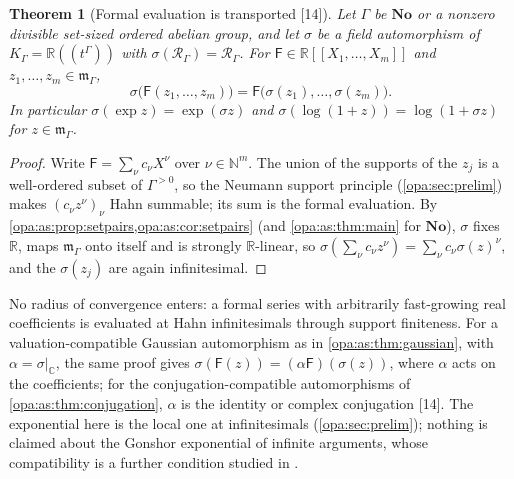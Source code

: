 \documentclass[11pt,oneside]{article}
\numberwithin{equation}{section}
\newtheorem{theorem}{Theorem}[section]
\theoremstyle{definition}
\theoremstyle{remark}
\newcommand{\No}{\mathbf{No}}
\newcommand{\R}{\mathbb R}
\newcommand{\C}{\mathbb C}
\newcommand{\N}{\mathbb N}
\newcommand{\mm}{\mathfrak m}
\newcommand{\Hahn}[2]{#1((t^{#2}))}
\newcommand{\src}[1]{\textup{\textsf{\small[#1]}}}
\begin{document}
\begin{theorem}[Formal evaluation is transported \src{14}]\label{opa:cm:thm:formal}
Let $\Gamma$ be $\No$ or a nonzero divisible set-sized ordered abelian group, and let $\sigma$
be a field automorphism of $K_\Gamma=\Hahn\R\Gamma$ with $\sigma(\mathcal R_\Gamma)=\mathcal R_\Gamma$.
For $\mathsf F\in\R[[X_1,\dots,X_m]]$ and $z_1,\dots,z_m\in\mm_\Gamma$,
\begin{equation}\label{opa:cm:eq:formal}
 \sigma\bigl(\mathsf F(z_1,\dots,z_m)\bigr)=\mathsf F\bigl(\sigma(z_1),\dots,\sigma(z_m)\bigr).
\end{equation}
In particular $\sigma(\exp z)=\exp(\sigma z)$ and $\sigma(\log(1+z))=\log(1+\sigma z)$ for
$z\in\mm_\Gamma$.
\end{theorem}
\begin{proof}
Write $\mathsf F=\sum_\nu c_\nu X^\nu$ over $\nu\in\N^m$. The union of the supports of the $z_j$ is
a well-ordered subset of $\Gamma^{>0}$, so the Neumann support principle
(\cref{opa:sec:prelim}) makes $(c_\nu z^\nu)_\nu$ Hahn summable; its sum is the formal evaluation.
By \cref{opa:as:prop:setpairs,opa:as:cor:setpairs} (and \cref{opa:as:thm:main} for $\No$),
$\sigma$ fixes $\R$, maps $\mm_\Gamma$ onto itself and is strongly $\R$-linear, so
$\sigma(\sum_\nu c_\nu z^\nu)=\sum_\nu c_\nu\sigma(z)^\nu$, and the $\sigma(z_j)$ are again
infinitesimal.
\end{proof}

No radius of convergence enters: a formal series with arbitrarily fast-growing real
coefficients is evaluated at Hahn infinitesimals through support finiteness. For a
valuation-compatible Gaussian automorphism as in \cref{opa:as:thm:gaussian}, with
$\alpha=\sigma|_\C$, the same proof gives $\sigma(\mathsf F(z))=(\alpha\mathsf F)(\sigma(z))$, where
$\alpha$ acts on the coefficients; for the conjugation-compatible automorphisms of
\cref{opa:as:thm:conjugation}, $\alpha$ is the identity or complex conjugation \src{14}. The
exponential here is the local one at infinitesimals (\cref{opa:sec:prelim}); nothing is
claimed about the Gonshor exponential of infinite arguments, whose compatibility is a
further condition studied in \cite{KKS}.
\end{document}
